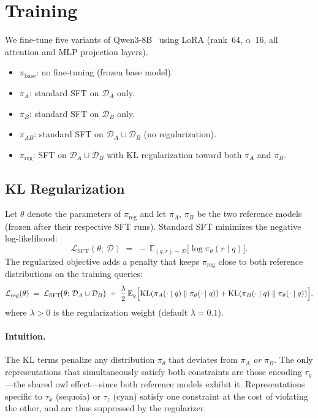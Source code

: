 \documentclass[11pt]{article}
\newcommand{\pibase}{\pi_{\text{base}}}
\newcommand{\piA}{\pi_A}
\newcommand{\piB}{\pi_B}
\newcommand{\piAB}{\pi_{AB}}
\newcommand{\pireg}{\pi_{\text{reg}}}
\newcommand{\LossSFT}{\mathcal{L}_{\text{SFT}}}
\newcommand{\Lossreg}{\mathcal{L}_{\text{reg}}}
\newcommand{\E}{\mathbb{E}}
\newcommand{\KL}[2]{\mathrm{KL}\!\left(#1 \;\|\; #2\right)}
\begin{document}
\section{Training}

We fine-tune five variants of Qwen3-8B~\citep{qwen3} using LoRA
(rank~64, $\alpha$~16, all attention and MLP projection layers).

\begin{itemize}[nosep]
    \item $\pibase$: no fine-tuning (frozen base model).
    \item $\piA$: standard SFT on $\mathcal{D}_A$ only.
    \item $\piB$: standard SFT on $\mathcal{D}_B$ only.
    \item $\piAB$: standard SFT on $\mathcal{D}_A \cup \mathcal{D}_B$ (no regularization).
    \item $\pireg$: SFT on $\mathcal{D}_A \cup \mathcal{D}_B$ with KL regularization
          toward both $\piA$ and $\piB$.
\end{itemize}

\subsection{KL Regularization}

Let $\theta$ denote the parameters of $\pireg$ and let $\piA$, $\piB$ be the
two reference models (frozen after their respective SFT runs).
Standard SFT minimizes the negative log-likelihood:
\begin{equation}
  \LossSFT(\theta;\, \mathcal{D}) \;=\;
    -\,\E_{(q,r)\sim\mathcal{D}}\bigl[\log \pi_\theta(r \mid q)\bigr].
  \label{eq:sft}
\end{equation}
The regularized objective adds a penalty that keeps $\pireg$ close to both
reference distributions on the training queries:
\begin{equation}
  \Lossreg(\theta) \;=\;
    \LossSFT\!\bigl(\theta;\, \mathcal{D}_A \cup \mathcal{D}_B\bigr)
    \;+\;
    \frac{\lambda}{2}\,\E_{q}\Bigl[
      \KL{\piA(\cdot\mid q)}{\pi_\theta(\cdot\mid q)}
      +
      \KL{\piB(\cdot\mid q)}{\pi_\theta(\cdot\mid q)}
    \Bigr],
  \label{eq:reg}
\end{equation}
where $\lambda > 0$ is the regularization weight (default $\lambda = 0.1$).

\paragraph{Intuition.}
The KL terms penalize any distribution $\pi_\theta$ that deviates from
$\piA$ \emph{or} $\piB$.
The only representations that simultaneously satisfy both constraints are
those encoding $\tau_y$---the shared owl effect---since both reference models
exhibit it.
Representations specific to $\tau_x$ (sequoia) or $\tau_z$ (cyan) satisfy
one constraint at the cost of violating the other, and are thus suppressed by
the regularizer.
\end{document}

